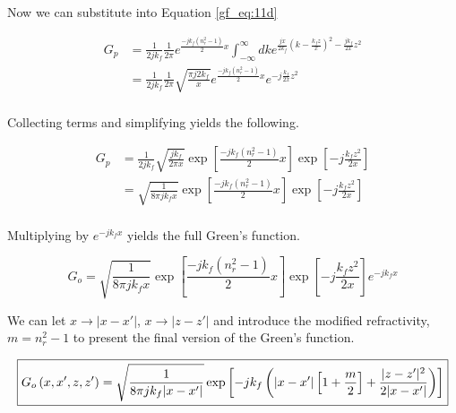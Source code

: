 \noindent Now we can substitute into Equation \ref{gf_eq:11d}

\begin{equation}
\begin{aligned}
G_p &= \frac{1}{2jk_f}\frac{1}{2\pi}e^{\frac{-jk_f(n_r^2-1)}{2}x}\int_{-\infty}^{\infty}dk e^{\frac{jx}{2k_f}\left(k  -\frac{k_fz}{x}\right)^2- \frac{jk_f}{2x}z^2 } \\
&= \frac{1}{2jk_f}\frac{1}{2\pi} \sqrt{\frac{\pi j2k_f}{x}}e^{\frac{-jk_f(n_r^2-1)}{2}x}e^{-j\frac{k_f}{2x}z^2 } \\
\end{aligned}
\label{gf_eq:11f}
\end{equation}
 \renewcommand{\baselinestretch}{2} \small\normalsize
 
\noindent Collecting terms and simplifying yields the following.

 \begin{equation}
\begin{aligned}
G_p &= \frac{1}{2jk_f}\sqrt{\frac{jk_f}{2\pi x}}\exp\left[\frac{-jk_f(n_r^2-1)}{2}x\right]\exp\left[-j\frac{k_fz^2}{2x} \right]\\
&= \sqrt{\frac{1}{8\pi j k_fx}}\exp\left[\frac{-jk_f(n_r^2-1)}{2}x\right]\exp\left[-j\frac{k_fz^2}{2x} \right]\\
\end{aligned}
\label{gf_eq:11ffa}
\end{equation}
 \renewcommand{\baselinestretch}{2} \small\normalsize
 
\noindent Multiplying by $e^{-jk_fx}$ yields the full Green's function.

\begin{equation}
G_o= \sqrt{\frac{1}{8\pi jk_fx}}\exp\left[\frac{-jk_f(n_r^2-1)}{2}x\right]\exp\left[-j\frac{k_fz^2}{2x} \right]e^{-jk_fx}
\label{gf_eq:11fa}
\end{equation}
  \renewcommand{\baselinestretch}{2} \small\normalsize
  
We can let $x\rightarrow |x-x'|$, $x\rightarrow |z-z'|$ and introduce the modified refractivity, $m = n_r^2-1$ to present the final version of the Green's function.

\begin{equation}
\boxed{G_o\left(x,x',z,z' \right)= \sqrt{\frac{1}{8\pi jk_f|x-x'|}}\exp\left[-jk_f\left(|x-x'|\left[1+\frac{m}{2}\right] + \frac{|z-z'|^2}{2|x-x'|}\right)\right]}\\
\label{gf_eq:11fb}
\end{equation}
 \renewcommand{\baselinestretch}{2} \small\normalsize
 
